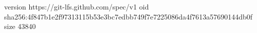 version https://git-lfs.github.com/spec/v1
oid sha256:4f847b1e2f97313115b53e3bc7edbb749f7e7225086da4f7613a57690144db0f
size 43840
